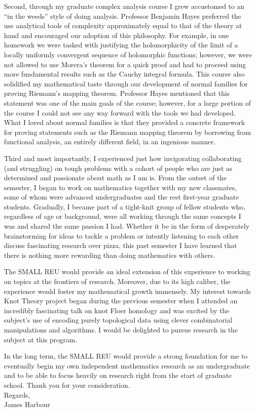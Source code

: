 \documentclass[11pt]{article}
\begin{document}
Second, through my graduate complex analysis course I grew accustomed to an ``in the weeds'' style of doing analysis. Professor Benjamin Hayes preferred the use analytical tools of complexity approximately equal to that of the theory at hand and encouraged our adoption of this philosophy. For example, in one homework we were tasked with justifying the holomorphicity of the limit of a locally uniformly convergent sequence of holomorphic functions; however, we were not allowed to use Morera's theorem for a quick proof and had to proceed using more fundamental results such as the Cauchy integral formula. This course also solidified my mathematical taste through our development of normal families for proving Riemann's mapping theorem. Professor Hayes mentioned that this statement was one of the main goals of the course; however, for a large portion of the course I could not see any way forward with the tools we had developed. What I loved about normal families is that they provided a concrete framework for proving statements such as the Riemann mapping theorem by borrowing from functional analysis, an entirely different field, in an ingenious manner.


Third and most importantly, I experienced just how invigorating collaborating (and struggling) on tough problems with a cohort of people who are just as determined and passionate about math as I am is. From the outset of the semester, I began to work on mathematics together with my new classmates, some of whom were advanced undergraduates and the rest first-year graduate students. Gradually, I became part of a tight-knit group of fellow students who, regardless of age or background, were all working through the same concepts I was and shared the same passion I had. Whether it be in the form of desperately brainstorming for ideas to tackle a problem or intently listening to each other discuss fascinating research over pizza, this past semester I have learned that there is nothing more rewarding than doing mathematics with others.

The SMALL REU would provide an ideal extension of this experience to working on topics at the frontiers of research. Moreover, due to its high caliber, the experience would foster my mathematical growth immensely. My interest towards Knot Theory project began during the previous semester when I attended an incredibly fascinating talk on knot Floer homology and was excited by the subject's use of encoding purely topological data using clever combinatorial manipulations and algorithms. I would be delighted to pursue research in the subject at this program.

In the long term, the SMALL REU would provide a strong foundation for me to eventually begin my own independent mathematics research as an undergraduate and to be able to focus heavily on research right from the start of graduate school. Thank you for your consideration. \\

\noindent Regards, \\

\noindent James Harbour
\end{document}
